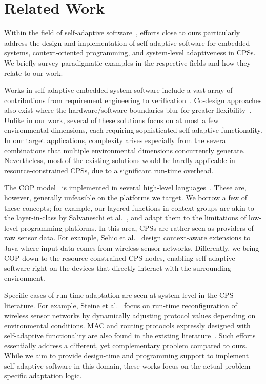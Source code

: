 \section{Related Work}
\label{sec:related}

Within the field of self-adaptive software~\cite{cheng:adaptive},
efforts close to ours particularly address the design and
implementation of self-adaptive software for embedded systems,
context-oriented programming, and system-level adaptiveness in
CPSs. We briefly survey paradigmatic examples in the respective fields
and how they relate to our work.

Works in self-adaptive embedded system software
include a vast array of contributions from requirement engineering to
verification~\cite{cheng:adaptive}. Co-design approaches also exist
where the hardware/software boundaries blur for greater
flexibility~\cite{diguet11:closed}. Unlike in our work, several of
these solutions focus on at most a few environmental dimensions, each
requiring sophisticated self-adaptive functionality. In our target
applications, complexity arises especially from the several
combinations that multiple environmental dimensions concurrently
generate. Nevertheless, most of the existing solutions would be hardly
applicable in resource-constrained CPSs, due to a significant
run-time overhead.

The COP model~\cite{Hirschfeld08} is implemented in several
high-level
languages~\cite{Kamina11,Ghezzi10,Bardram05,Sehic11,Salvaneschi12}. These
are, however, generally unfeasible on the platforms we target. We
borrow a few of these concepts; for example, our layered functions in
context groups are akin to the layer-in-class by Salvaneschi et
al.~\cite{Salvaneschi12}, and adapt them to the limitations of
low-level programming platforms. In this area, CPSs are rather seen as
providers of raw sensor data. For example, Sehic et al.~\cite{Sehic11}
design context-aware extensions to Java where input data comes from
wireless sensor networks. Differently, we bring COP down to the
resource-constrained CPS nodes, enabling self-adaptive software right
on the devices that directly interact with the surrounding
environment.

Specific cases of run-time adaptation are seen at system level in the
CPS literature. For example, Steine et al.~\cite{Steine11} focus on
run-time reconfiguration of wireless sensor networks by dynamically
adjusting protocol values depending on environmental conditions. MAC
and routing protocols expressly designed with self-adaptive
functionality are also found in the existing
literature~\cite{Park08,Bourdenas11}. Such efforts essentially address
a different, yet complementary problem compared to ours. While we aim
to provide design-time and programming support to implement
self-adaptive software in this domain, these works focus on the actual
problem-specific adaptation logic.


